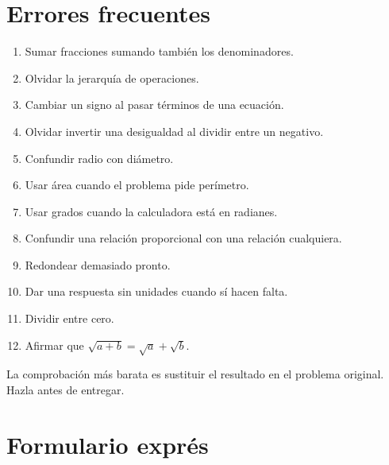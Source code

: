 \documentclass[10pt,oneside]{book}
\begin{document}
	\chapter{Errores frecuentes}
	
	\begin{enumerate}
		\item Sumar fracciones sumando también los denominadores.
		\item Olvidar la jerarquía de operaciones.
		\item Cambiar un signo al pasar términos de una ecuación.
		\item Olvidar invertir una desigualdad al dividir entre un negativo.
		\item Confundir radio con diámetro.
		\item Usar área cuando el problema pide perímetro.
		\item Usar grados cuando la calculadora está en radianes.
		\item Confundir una relación proporcional con una relación cualquiera.
		\item Redondear demasiado pronto.
		\item Dar una respuesta sin unidades cuando sí hacen falta.
		\item Dividir entre cero.
		\item Afirmar que $\sqrt{a+b}=\sqrt a+\sqrt b$.
	\end{enumerate}
	
	La comprobación más barata es sustituir el resultado en el
	problema original. Hazla antes de entregar.
	
	\chapter{Formulario exprés}
	
\end{document}
